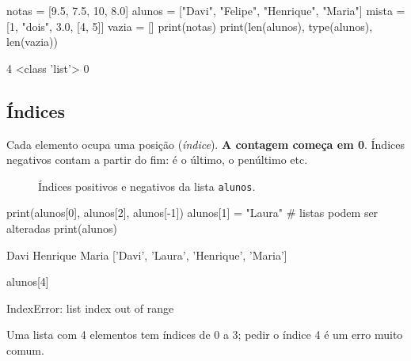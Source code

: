 \begin{entrada}
notas = [9.5, 7.5, 10, 8.0]
alunos = ["Davi", "Felipe", "Henrique", "Maria"]
mista = [1, "dois", 3.0, [4, 5]]
vazia = []
print(notas)
print(len(alunos), type(alunos), len(vazia))
\end{entrada}
\begin{saida}
[9.5, 7.5, 10, 8.0]
4 <class 'list'> 0
\end{saida}

\subsection{Índices}

Cada elemento ocupa uma posição (\emph{índice}). \textbf{A contagem começa em 0}. Índices negativos contam a
partir do fim:  é o último,  o penúltimo etc.

\begin{figure}[ht]
\centering
{}
\caption{Índices positivos e negativos da lista \texttt{alunos}.}
\label{fig:indices}
\end{figure}

\begin{entrada}
print(alunos[0], alunos[2], alunos[-1])
alunos[1] = "Laura"        # listas podem ser alteradas
print(alunos)
\end{entrada}
\begin{saida}
Davi Henrique Maria
['Davi', 'Laura', 'Henrique', 'Maria']
\end{saida}

\begin{entrada}
alunos[4]
\end{entrada}
\begin{saida}
IndexError: list index out of range
\end{saida}

Uma lista com 4 elementos tem índices de 0 a 3; pedir o índice 4 é um erro muito comum.

